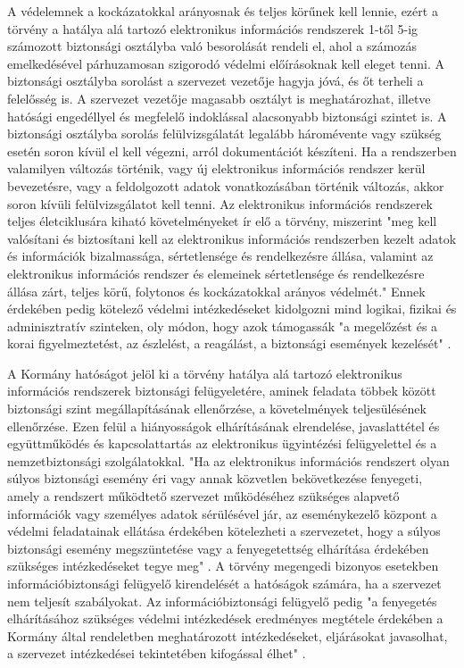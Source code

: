 A védelemnek a kockázatokkal arányosnak és teljes körűnek kell lennie, ezért a törvény a hatálya alá tartozó elektronikus információs rendszerek 1-től 5-ig számozott biztonsági osztályba való besorolását rendeli el, ahol a számozás emelkedésével párhuzamosan szigorodó védelmi előírásoknak kell eleget tenni. A biztonsági osztályba sorolást a szervezet vezetője hagyja jóvá, és őt terheli a felelősség is. A szervezet vezetője magasabb osztályt is meghatározhat, illetve hatósági engedéllyel és megfelelő indoklással alacsonyabb biztonsági szintet is. A biztonsági osztályba sorolás felülvizsgálatát legalább háromévente vagy szükség esetén soron kívül el kell végezni, arról dokumentációt készíteni. Ha a rendszerben valamilyen változás történik, vagy új elektronikus információs rendszer kerül bevezetésre, vagy a feldolgozott adatok vonatkozásában történik változás, akkor soron kívüli felülvizsgálatot kell tenni. Az elektronikus információs rendszerek teljes életciklusára kiható követelményeket ír elő a törvény, miszerint "meg kell valósítani és biztosítani kell az elektronikus információs rendszerben kezelt adatok és információk bizalmassága, sértetlensége és rendelkezésre állása, valamint az elektronikus információs rendszer és elemeinek sértetlensége és rendelkezésre állása zárt, teljes körű, folytonos és kockázatokkal arányos védelmét." \cite{2013-L-torveny} Ennek érdekében pedig kötelező védelmi intézkedéseket kidolgozni mind logikai, fizikai és adminisztratív szinteken, oly módon, hogy azok támogassák "a megelőzést és a korai figyelmeztetést, az észlelést, a reagálást, a biztonsági események kezelését" \cite{2013-L-torveny}.

A Kormány hatóságot jelöl ki a törvény hatálya alá tartozó elektronikus információs rendszerek biztonsági felügyeletére, aminek feladata többek között biztonsági szint megállapításának ellenőrzése, a követelmények teljesülésének ellenőrzése. Ezen felül a hiányosságok elhárításának elrendelése, javaslattétel és együttműködés és kapcsolattartás az elektronikus ügyintézési felügyelettel és a nemzetbiztonsági szolgálatokkal. "Ha az elektronikus információs rendszert olyan súlyos biztonsági esemény éri vagy annak közvetlen bekövetkezése fenyegeti, amely a rendszert működtető szervezet működéséhez szükséges alapvető információk vagy személyes adatok sérülésével jár, az eseménykezelő központ a védelmi feladatainak ellátása érdekében kötelezheti a szervezetet, hogy a súlyos biztonsági esemény megszüntetése vagy a fenyegetettség elhárítása érdekében szükséges intézkedéseket tegye meg" \cite{2013-L-torveny}. A törvény megengedi bizonyos esetekben információbiztonsági felügyelő kirendelését a hatóságok számára, ha a szervezet nem teljesít szabályokat. Az információbiztonsági felügyelő pedig "a fenyegetés elhárításához szükséges védelmi intézkedések eredményes megtétele érdekében a Kormány által rendeletben meghatározott intézkedéseket, eljárásokat javasolhat, a szervezet intézkedései tekintetében kifogással élhet" \cite{2013-L-torveny}.

